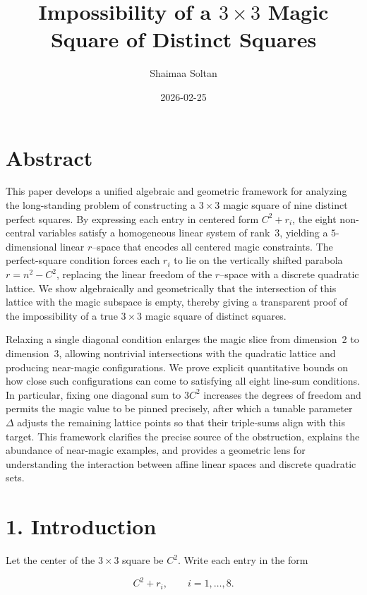 \documentclass[12pt]{article}
\title{Impossibility of a $3\times 3$ Magic Square of Distinct Squares}
\author{Shaimaa Soltan}
\date{2026-02-25}
\begin{document}
\maketitle


\section*{Abstract}

This paper develops a unified algebraic and geometric framework for analyzing
the long-standing problem of constructing a $3\times 3$ magic square of nine
distinct perfect squares.  By expressing each entry in centered form
$C^2+r_i$, the eight non-central variables satisfy a homogeneous linear system
of rank~$3$, yielding a $5$-dimensional linear $r$--space that encodes all
centered magic constraints.  The perfect-square condition forces each $r_i$ to
lie on the vertically shifted parabola $r=n^2-C^2$, replacing the linear
freedom of the $r$--space with a discrete quadratic lattice.  We show
algebraically and geometrically that the intersection of this lattice with the
magic subspace is empty, thereby giving a transparent proof of the
impossibility of a true $3\times 3$ magic square of distinct squares.

Relaxing a single diagonal condition enlarges the magic slice from dimension~2
to dimension~3, allowing nontrivial intersections with the quadratic lattice
and producing near-magic configurations.  We prove explicit quantitative bounds
on how close such configurations can come to satisfying all eight line-sum
conditions.  In particular, fixing one diagonal sum to $3C^2$ increases the
degrees of freedom and permits the magic value to be pinned precisely, after
which a tunable parameter $\Delta$ adjusts the remaining lattice points so
that their triple-sums align with this target.  This framework clarifies the
precise source of the obstruction, explains the abundance of near-magic
examples, and provides a geometric lens for understanding the interaction
between affine linear spaces and discrete quadratic sets.




\section*{1. Introduction}

Let the center of the $3\times 3$ square be $C^2$.  
Write each entry in the form


\[
C^2 + r_i,\qquad i=1,\dots,8.
\]
\end{document}
